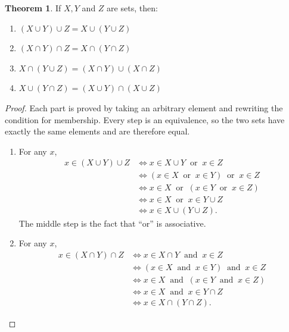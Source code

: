 \documentclass[11pt,a4paper]{article}
\theoremstyle{definition}
\newtheorem{thm}{Theorem}[subsection]
\begin{document}
\begin{thm}
If $X, Y$ and $Z$ are sets, then:
\begin{enumerate}
\item[i.] $(X\cup Y)\cup Z=X\cup (Y\cup Z)$
\item[ii.] $(X\cap Y)\cap Z=X\cap (Y\cap Z)$
\item[iii.] $X\cap (Y\cup Z)=(X\cap Y)\cup (X\cap Z)$
\item[iv.] $X\cup (Y\cap Z)=(X\cup Y)\cap (X\cup Z)$
\end{enumerate}
\end{thm}
\begin{proof}
Each part is proved by taking an arbitrary element and rewriting the condition
for membership. Every step is an equivalence, so the two sets have exactly the
same elements and are therefore equal.

\begin{enumerate}
\item[i.] For any $x$,
\begin{align*}
x\in (X\cup Y)\cup Z &\iff x\in X\cup Y \ \text{ or }\ x\in Z\\
                     &\iff (x\in X \ \text{ or }\ x\in Y) \ \text{ or }\ x\in Z\\
                     &\iff x\in X \ \text{ or }\ (x\in Y \ \text{ or }\ x\in Z)\\
                     &\iff x\in X \ \text{ or }\ x\in Y\cup Z\\
                     &\iff x\in X\cup (Y\cup Z).
\end{align*}
The middle step is the fact that ``or'' is associative.

\item[ii.] For any $x$,
\begin{align*}
x\in (X\cap Y)\cap Z &\iff x\in X\cap Y \ \text{ and }\ x\in Z\\
                     &\iff (x\in X \ \text{ and }\ x\in Y) \ \text{ and }\ x\in Z\\
                     &\iff x\in X \ \text{ and }\ (x\in Y \ \text{ and }\ x\in Z)\\
                     &\iff x\in X \ \text{ and }\ x\in Y\cap Z\\
                     &\iff x\in X\cap (Y\cap Z).
\end{align*}


\end{enumerate}
\end{proof}
\end{document}
